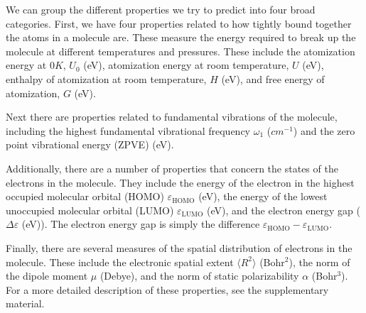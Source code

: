 \documentclass{article}
\begin{document}
We can group the different properties we try to predict into four broad categories. First, we have four properties related to how tightly bound together the atoms in a molecule are. These measure the energy required to break up the molecule at different temperatures and pressures. These include the atomization energy at $0K$, $U_0$ (eV), atomization energy at room temperature, $U$ (eV), enthalpy of atomization at room temperature, $H$ (eV), and free energy of atomization, $G$ (eV).

Next there are properties related to fundamental vibrations of the molecule, including the highest fundamental vibrational frequency $\omega_1$ ($cm^{-1}$) and the zero point vibrational energy (ZPVE) (eV). 

Additionally, there are a number of properties that concern the states of the electrons in the molecule. They include the energy of the electron in the highest occupied molecular orbital (HOMO) $\varepsilon_{\text{HOMO}}$ (eV), the energy of the lowest unoccupied molecular orbital (LUMO) $\varepsilon_{\text{LUMO}}$ (eV), and the electron energy gap ($\Delta\varepsilon$ (eV)). The electron energy gap is simply the difference $\varepsilon_{\text{HOMO}} - \varepsilon_{\text{LUMO}}$.  

Finally, there are several measures of the spatial distribution of electrons in the molecule. These include the electronic spatial extent $\langle R^2\rangle$ (Bohr$^2$), the norm of the dipole moment $\mu$ (Debye), and the norm of static polarizability $\alpha$ (Bohr$^3$). For a more detailed description of these properties, see the supplementary material.
\end{document}
